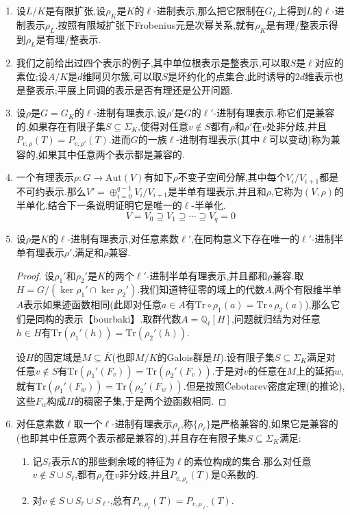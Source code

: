 \begin{enumerate}
	\item 设$L/K$是有限扩张,设$\rho_K$是$K$的$\ell$-进制表示,那么把它限制在$G_L$上得到$L$的$\ell$-进制表示$\rho_L$.按照有限域扩张下Frobenius元是次幂关系,就有$\rho_K$是有理/整表示得到$\rho_L$是有理/整表示.
	\item 我们之前给出过四个表示的例子,其中单位根表示是整表示,可以取$S$是$\ell$对应的素位;设$A/K$是$d$维阿贝尔簇,可以取$S$是坏约化的点集合,此时诱导的$2d$维表示也是整表示;平展上同调的表示是否有理还是公开问题.
	\item 设$\rho$是$G=G_K$的$\ell$-进制有理表示,设$\rho'$是$G$的$\ell'$-进制有理表示.称它们是兼容的,如果存在有限子集$S\subseteq\Sigma_K$,使得对任意$v\not\in S$都有$\rho$和$\rho'$在$v$处非分歧,并且$P_{v,\rho}(T)=P_{v,\rho'}(T)$.进而$G$的一族$\ell$-进制有理表示(其中$\ell$可以变动)称为兼容的,如果其中任意两个表示都是兼容的.
	\item 一个有理表示$\rho:G\to\mathrm{Aut}(V)$有如下$\rho$不变子空间分解,其中每个$V_i/V_{i+1}$都是不可约表示.那么$V'=\oplus_{i=0}^{q-1}V_i/V_{i+1}$是半单有理表示,并且和$\rho$,它称为$(V,\rho)$的半单化.结合下一条说明证明它是唯一的$\ell$-半单化.
	$$V=V_0\supseteq V_1\supseteq\cdots\supseteq V_q=0$$
	\item 设$\rho$是$K$的$\ell$-进制有理表示,对任意素数$\ell'$,在同构意义下存在唯一的$\ell'$-进制半单有理表示$\rho'$,满足和$\rho$兼容.
	\begin{proof}
		
		设$\rho_1'$和$\rho_2'$是$K$的两个$\ell'$-进制半单有理表示,并且都和$\rho$兼容.取$H=G/(\ker\rho_1'\cap\ker\rho_2')$.我们知道特征零的域上的代数$A$,两个有限维半单$A$表示如果迹函数相同(此即对任意$a\in A$有$\mathrm{Tr}\circ\rho_1(a)=\mathrm{Tr}\circ\rho_2(a)$),那么它们是同构的表示【bourbaki】.取群代数$A=\mathbb{Q}_{\ell}[H]$,问题就归结为对任意$h\in H$有$\mathrm{Tr}(\rho_1'(h))=\mathrm{Tr}(\rho_2'(h))$.
		
		\qquad
		
		设$H$的固定域是$M\subseteq\overline{K}$(也即$M/K$的Galois群是$H$).设有限子集$S\subseteq\Sigma_K$满足对任意$v\not\in S$有$\mathrm{Tr}(\rho_1'(F_v))=\mathrm{Tr}(\rho_2'(F_v))$.于是对$v$的任意在$M$上的延拓$w$,就有$\mathrm{Tr}(\rho_1'(F_w))=\mathrm{Tr}(\rho_2'(F_w))$.但是按照\v{C}ebotarev密度定理(的推论),这些$F_w$构成$H$的稠密子集,于是两个迹函数相同.
	\end{proof}
    \item 对任意素数$\ell$取一个$\ell$-进制有理表示$\rho_{\ell}$,称$\{\rho_{\ell}\}$是严格兼容的,如果它是兼容的(也即其中任意两个表示都是兼容的),并且存在有限子集$S\subseteq\Sigma_K$满足:
    \begin{enumerate}[(1)]
    	\item 记$S_{\ell}$表示$K$的那些剩余域的特征为$\ell$的素位构成的集合.那么对任意$v\not\in S\cup S_{\ell}$,都有$\rho_{\ell}$在$v$非分歧,并且$P_{v,\rho_{\ell}}(T)$是$\mathbb{Q}$系数的.
    	\item 对$v\not\in S\cup S_{\ell}\cup S_{\ell'}$,总有$P_{v,\rho_{\ell}}(T)=P_{v,\rho_{\ell'}}(T)$.
    \end{enumerate}


\end{enumerate}
